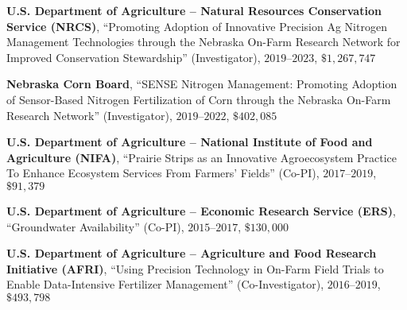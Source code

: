 \documentclass[10pt,margin,line]{res}
\newenvironment{list1}{
  \begin{list}{\ding{113}}{%
      \setlength{\itemsep}{0in}
      \setlength{\parsep}{0in} \setlength{\parskip}{0in}
      \setlength{\topsep}{0in} \setlength{\partopsep}{0in}
      \setlength{\leftmargin}{0.17in}}}{\end{list}}
\begin{document}
\begin{resume}
\begin{list1}
\vspace*{.05in}
\item[] \textbf{U.S. Department of Agriculture -- Natural Resources Conservation Service (NRCS)}, ``Promoting Adoption of Innovative Precision Ag Nitrogen Management Technologies through the Nebraska On-Farm Research Network for Improved Conservation Stewardship'' (Investigator), $2019$--$2023$, $\$1,267,747$
\vspace*{.05in}
\item[] \textbf{Nebraska Corn Board}, ``SENSE Nitrogen Management: Promoting Adoption of Sensor-Based Nitrogen Fertilization of Corn through the Nebraska On-Farm Research Network'' (Investigator), $2019$--$2022$, $\$402,085$
\vspace*{.05in}
\item[] \textbf{U.S. Department of Agriculture -- National Institute of Food and Agriculture (NIFA)}, ``Prairie Strips as an Innovative Agroecosystem Practice To Enhance Ecosystem Services From Farmers' Fields'' (Co-PI), $2017$--$2019$, $\$91,379$
\vspace*{.05in}
\item[] \textbf{U.S. Department of Agriculture -- Economic Research Service (ERS)}, ``Groundwater Availability'' (Co-PI), $2015$--$2017$, $\$130,000$
\vspace*{.05in}
\item[] \textbf{U.S. Department of Agriculture -- Agriculture and Food Research Initiative (AFRI)}, ``Using Precision Technology in On-Farm Field Trials to Enable Data-Intensive Fertilizer Management'' (Co-Investigator), $2016$--$2019$, $\$493,798$
\vspace*{.05in}
\end{list1}


\end{resume}
\end{document}

